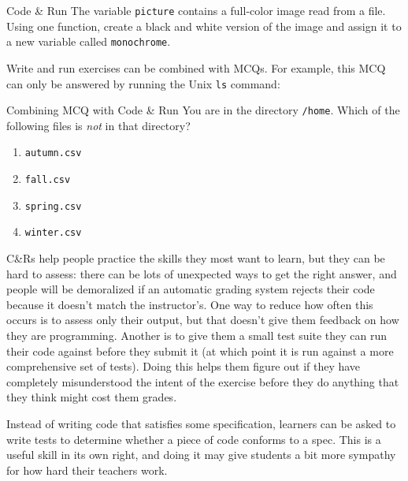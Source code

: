 \begin{aside}{Code \& Run}
  The variable \texttt{picture} contains a full-color image read from a file.
  Using one function,
  create a black and white version of the image
  and assign it to a new variable called \texttt{monochrome}.
\end{aside}

Write and run exercises can be combined with MCQs.
For example,
this MCQ can only be answered by running the Unix \texttt{ls} command:

\begin{aside}{Combining MCQ with Code \& Run}
  You are in the directory \texttt{/home}.
  Which of the following files is \emph{not} in that directory?

  \begin{enumerate}
  \item
    \texttt{autumn.csv}
  \item
    \texttt{fall.csv}
  \item
    \texttt{spring.csv}
  \item
    \texttt{winter.csv}
  \end{enumerate}
\end{aside}

C\&Rs help people practice the skills they most want to learn,
but they can be hard to assess:
there can be lots of unexpected ways to get the right answer,
and people will be demoralized if an automatic grading system rejects their code
because it doesn't match the instructor's.
One way to reduce how often this occurs is to assess only their output,
but that doesn't give them feedback on how they are programming.
Another is to give them a small test suite they can run their code against
before they submit it
(at which point it is run against a more comprehensive set of tests).
Doing this helps them figure out if they have completely misunderstood the intent of the exercise
before they do anything that they think might cost them grades.

Instead of writing code that satisfies some specification,
learners can be asked to write tests
to determine whether a piece of code conforms to a spec.
This is a useful skill in its own right,
and doing it may give students a bit more sympathy for how hard their teachers work.

